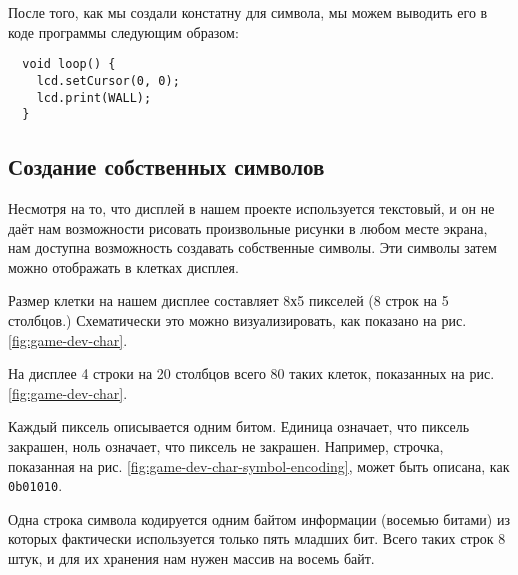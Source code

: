\documentclass[../sparc.tex]{subfiles}
\begin{document}
После того, как мы создали констатну для символа, мы можем выводить его в коде
программы следующим образом:

\begin{verbatim}
  void loop() {
    lcd.setCursor(0, 0);
    lcd.print(WALL);
  }
\end{verbatim}

\subsection{Создание собственных символов}

Несмотря на то, что дисплей в нашем проекте используется текстовый, и он не даёт
нам возможности рисовать произвольные рисунки в любом месте экрана, нам доступна
возможность создавать собственные символы.  Эти символы затем можно отображать в
клетках дисплея.

Размер клетки на нашем дисплее составляет 8х5 пикселей (8 строк на 5 столбцов.)
Схематически это можно визуализировать, как показано на
рис. \ref{fig:game-dev-char}.


На дисплее 4 строки на 20 столбцов всего 80 таких клеток, показанных на рис.
\ref{fig:game-dev-char}.

Каждый пиксель описывается одним битом. Единица означает, что пиксель закрашен,
ноль означает, что пиксель не закрашен. Например, строчка, показанная на рис.
\ref{fig:game-dev-char-symbol-encoding}, может быть описана, как
\texttt{0b01010}.



Одна строка символа кодируется одним байтом информации (восемью битами) из
которых фактически используется только пять младших бит.  Всего таких строк 8
штук, и для их хранения нам нужен массив на восемь байт.
\end{document}
